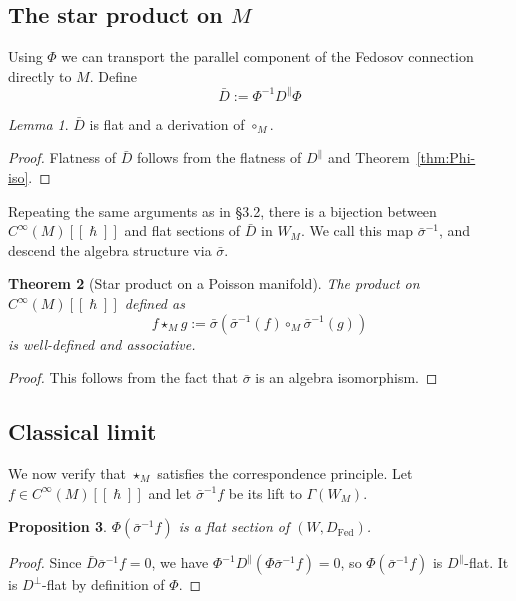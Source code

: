 \documentclass[
  12pt,
  a4paper, oneside
]{report}
\renewcommand{\hbar}{\hslash}
\theoremstyle{bolddef}
\newtheorem{theorem}{Theorem}[chapter]
\newtheorem{proposition}[theorem]{Proposition}
\theoremstyle{remark}
\newtheorem{lemma}[theorem]{Lemma}
\numberwithin{equation}{chapter}
\begin{document}
\subsection*{The star product on $M$}

Using $\Phi$ we can transport the parallel component of the Fedosov connection directly to $M$. Define
\begin{equation}\label{eq:Dbar-def}
\bar{D} := \Phi^{-1} D^\parallel \Phi
\end{equation}

\begin{lemma}\label{lem:Dbar-flat}
$\bar{D}$ is flat and a derivation of $\circ_M$.
\end{lemma}
\begin{proof}
Flatness of $\bar{D}$ follows from the flatness of $D^\parallel$ and Theorem~\ref{thm:Phi-iso}.
\end{proof}

Repeating the same arguments as in \S 3.2, there is a bijection between $C^\infty(M)[[\hbar]]$ and flat sections of $\bar{D}$ in $W_M$. We call this map $\bar{\sigma}^{-1}$, and descend the algebra structure via $\bar{\sigma}$.

\begin{theorem}[Star product on a Poisson manifold]\label{thm:star-M}
The product on $C^\infty(M)[[\hbar]]$ defined as
\[
f \star_M g := \bar{\sigma}\!\left(\bar{\sigma}^{-1}(f) \circ_M \bar{\sigma}^{-1}(g)\right)
\]
is well-defined and associative.
\end{theorem}
\begin{proof}
This follows from the fact that $\bar{\sigma}$ is an algebra isomorphism.
\end{proof}

\subsection*{Classical limit}

We now verify that $\star_M$ satisfies the correspondence principle. Let $f \in C^\infty(M)[[\hbar]]$ and let $\bar{\sigma}^{-1} f$ be its lift to $\Gamma(W_M)$.

\begin{proposition}\label{prop:fed-flat}
$\Phi(\bar{\sigma}^{-1} f)$ is a flat section of $(W, D_{\mathrm{Fed}})$.
\end{proposition}
\begin{proof}
Since $\bar{D}\bar{\sigma}^{-1}f = 0$, we have $\Phi^{-1} D^\parallel (\Phi \bar{\sigma}^{-1}f) = 0$, so $\Phi(\bar{\sigma}^{-1}f)$ is $D^\parallel$-flat. It is $D^\perp$-flat by definition of $\Phi$.
\end{proof}
\end{document}
